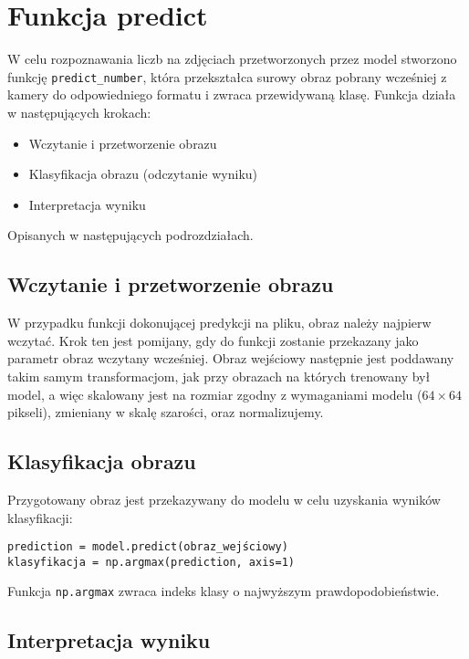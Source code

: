 \section{Funkcja predict}\label{sec:funkcja-predict}

W celu rozpoznawania liczb na zdjęciach przetworzonych przez model stworzono funkcję \texttt{predict\_number},
która przekształca surowy obraz pobrany wcześniej z kamery do odpowiedniego formatu i zwraca przewidywaną klasę.
Funkcja działa w następujących krokach:
\begin{itemize}
    \item Wczytanie i przetworzenie obrazu
    \item Klasyfikacja obrazu (odczytanie wyniku)
    \item Interpretacja wyniku
\end{itemize}
Opisanych w następujących podrozdziałach.

\subsection{Wczytanie i przetworzenie obrazu}\label{subsec:wczytanie-i-przetworzenie-obrazu}

W przypadku funkcji dokonującej predykcji na pliku, obraz należy najpierw wczytać.
Krok ten jest pomijany, gdy do funkcji zostanie przekazany jako parametr obraz wczytany wcześniej.
Obraz wejściowy następnie jest poddawany takim samym transformacjom, jak przy obrazach na których trenowany był model,
a więc skalowany jest na rozmiar zgodny z wymaganiami modelu ($64 \times 64$ pikseli), zmieniany w skalę szarości, oraz normalizujemy.

\subsection{Klasyfikacja obrazu}\label{subsec:klasyfikacja-obrazu}

Przygotowany obraz jest przekazywany do modelu w celu uzyskania wyników klasyfikacji:

\begin{verbatim}
prediction = model.predict(obraz_wejściowy)
klasyfikacja = np.argmax(prediction, axis=1)
\end{verbatim}

Funkcja \texttt{np.argmax} zwraca indeks klasy o najwyższym prawdopodobieństwie.

\subsection{Interpretacja wyniku}\label{subsec:interpretacja-wyniku}

